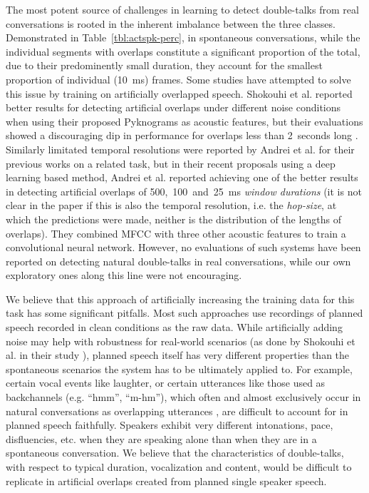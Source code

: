 \documentclass[a4paper]{article}
\begin{document}
The most potent source of challenges in learning to detect double-talks from real conversations
is rooted in the inherent imbalance between the three classes.
Demonstrated in Table~\ref{tbl:actspk-perc}, in spontaneous conversations,
while the individual segments with overlaps constitute a significant proportion of the total,
due to their predominently small duration,
they account for the smallest proportion of individual (10~ms) frames.
Some studies have attempted to solve this issue by training on artificially overlapped speech.
Shokouhi et al. reported better results for detecting artificial overlaps under different noise conditions
when using their proposed Pyknograms as acoustic features,
but their evaluations showed a discouraging dip in performance for overlaps less than 2~seconds long \cite{shokouhi_teager_2017}.
Similarly limitated temporal resolutions were reported by Andrei et al. for their previous works on a related task,
but in their recent proposals using a deep learning based method,
Andrei et al. reported achieving one of the better results in detecting artificial overlaps of
500,~100~and~25~ms \textit{window durations} \cite{AndreiDetectingOverlappedSpeech2017}
(it is not clear in the paper if this is also the temporal resolution, i.e. the \textit{hop-size}, at which the predictions were made, neither is the distribution of the lengths of overlaps).
They combined MFCC with three other acoustic features to train a convolutional neural network.
However, no evaluations of such systems have been reported on detecting natural double-talks in real conversations,
while our own exploratory ones along this line were not encouraging.

We believe that this approach of artificially increasing the training data for
this task has some significant pitfalls.
Most such approaches use recordings of planned speech recorded in clean conditions as the raw data.
While artificially adding noise may help with robustness for real-world scenarios
(as done by Shokouhi et al. in their study \cite{shokouhi_teager_2017}),
planned speech itself has very different properties than
the spontaneous scenarios the system has to be ultimately applied to.
For example, certain vocal events like laughter,
or certain utterances like those used as backchannels (e.g. ``hmm'', ``m-hm''),
which often and almost exclusively occur in natural conversations as overlapping utterances \cite{GeigerUsinglinguisticinformation2013},
are difficult to account for in planned speech faithfully.
Speakers exhibit very different intonations, pace, disfluencies, etc. when
they are speaking alone than when they are in a spontaneous conversation.
We believe that the characteristics of double-talks,
with respect to typical duration, vocalization and content,
would be difficult to replicate in artificial overlaps created from planned single speaker speech.
\end{document}
